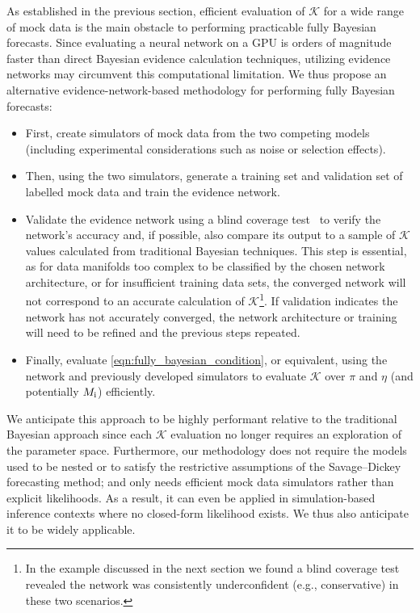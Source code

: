 \documentclass[twocolumn,english,aps,prd,amsmath,amssymb,reprint,floatfix,nofootinbib,showkeys]{revtex4-2}
\newcommand{\prior}{\pi}
\newcommand{\br}{\mathcal{K}}
\newif\ifhighlightchanges
\newcommand{\change}[1]{{\ifhighlightchanges\color{red} #1\else #1\fi}}
\begin{document}
As established in the previous section, efficient evaluation of $\br$ for a wide range of mock data is the main obstacle to performing practicable fully Bayesian forecasts. 
Since evaluating a neural network on a GPU is orders of magnitude faster than direct Bayesian evidence calculation techniques, utilizing evidence networks may circumvent this computational limitation. 
We thus propose an alternative evidence-network-based methodology for performing fully Bayesian forecasts:
\begin{itemize}
    \item First, create simulators of mock data from the two competing models (including experimental considerations such as noise \change{or selection effects}).
    \item Then, using the two simulators, generate a training set and validation set of labelled mock data and train the evidence network.
    \item Validate the evidence network using a blind coverage test~\citep{EN} \change{to verify the network's accuracy} and, if possible, \change{also} compare its output to a sample of $\br$ values calculated from traditional Bayesian techniques. \change{This step is essential, as for data manifolds too complex to be classified by the chosen network architecture, or for insufficient training data sets, the converged network will not correspond to an accurate calculation of $\br$\footnote{\change{In the example discussed in the next section we found a blind coverage test revealed the network was consistently underconfident (e.g., conservative) in these two scenarios.}}. If validation indicates the network has not accurately converged, the network architecture or training will need to be refined and the previous steps repeated.}
    \item Finally, evaluate \cref{eqn:fully_bayesian_condition}, or equivalent, using the network and previously developed simulators to evaluate $\br$ over $\prior$ and $\eta$ (and potentially $M_{\rm i}$) efficiently. 
\end{itemize}
We anticipate this approach to be highly performant relative to the traditional Bayesian approach since each $\br$ evaluation no longer requires an exploration of the parameter space.
Furthermore, our methodology \change{does not require the models used to be nested or to satisfy the restrictive assumptions of the Savage–Dickey forecasting method; and} only needs efficient mock data simulators \change{rather than explicit likelihoods}.
As a result, it can \change{even} be applied in simulation-based inference contexts where no closed-form likelihood exists.
\change{We thus also anticipate it to be} widely applicable. 
\end{document}
